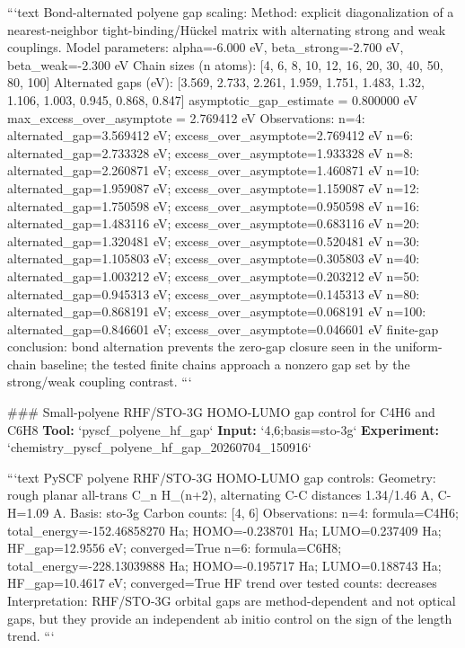 \documentclass[11pt,a4paper]{article}
\begin{document}
```text
Bond-alternated polyene gap scaling:
  Method: explicit diagonalization of a nearest-neighbor tight-binding/Hückel matrix with alternating strong and weak couplings.
  Model parameters: alpha=-6.000 eV, beta\_strong=-2.700 eV, beta\_weak=-2.300 eV
  Chain sizes (n atoms): [4, 6, 8, 10, 12, 16, 20, 30, 40, 50, 80, 100]
  Alternated gaps (eV): [3.569, 2.733, 2.261, 1.959, 1.751, 1.483, 1.32, 1.106, 1.003, 0.945, 0.868, 0.847]
  asymptotic\_gap\_estimate = 0.800000 eV
  max\_excess\_over\_asymptote = 2.769412 eV
  Observations:
    n=4: alternated\_gap=3.569412 eV; excess\_over\_asymptote=2.769412 eV
    n=6: alternated\_gap=2.733328 eV; excess\_over\_asymptote=1.933328 eV
    n=8: alternated\_gap=2.260871 eV; excess\_over\_asymptote=1.460871 eV
    n=10: alternated\_gap=1.959087 eV; excess\_over\_asymptote=1.159087 eV
    n=12: alternated\_gap=1.750598 eV; excess\_over\_asymptote=0.950598 eV
    n=16: alternated\_gap=1.483116 eV; excess\_over\_asymptote=0.683116 eV
    n=20: alternated\_gap=1.320481 eV; excess\_over\_asymptote=0.520481 eV
    n=30: alternated\_gap=1.105803 eV; excess\_over\_asymptote=0.305803 eV
    n=40: alternated\_gap=1.003212 eV; excess\_over\_asymptote=0.203212 eV
    n=50: alternated\_gap=0.945313 eV; excess\_over\_asymptote=0.145313 eV
    n=80: alternated\_gap=0.868191 eV; excess\_over\_asymptote=0.068191 eV
    n=100: alternated\_gap=0.846601 eV; excess\_over\_asymptote=0.046601 eV
  finite-gap conclusion: bond alternation prevents the zero-gap closure seen in the uniform-chain baseline; the tested finite chains approach a nonzero gap set by the strong/weak coupling contrast.
```

\#\#\# Small-polyene RHF/STO-3G HOMO-LUMO gap control for C4H6 and C6H8
\textbf{Tool:} `pyscf\_polyene\_hf\_gap`
\textbf{Input:} `4,6;basis=sto-3g`
\textbf{Experiment:} `chemistry\_pyscf\_polyene\_hf\_gap\_20260704\_150916`

```text
PySCF polyene RHF/STO-3G HOMO-LUMO gap controls:
  Geometry: rough planar all-trans C\_n H\_(n+2), alternating C-C distances 1.34/1.46 A, C-H=1.09 A.
  Basis: sto-3g
  Carbon counts: [4, 6]
  Observations:
    n=4: formula=C4H6; total\_energy=-152.46858270 Ha; HOMO=-0.238701 Ha; LUMO=0.237409 Ha; HF\_gap=12.9556 eV; converged=True
    n=6: formula=C6H8; total\_energy=-228.13039888 Ha; HOMO=-0.195717 Ha; LUMO=0.188743 Ha; HF\_gap=10.4617 eV; converged=True
  HF trend over tested counts: decreases
  Interpretation: RHF/STO-3G orbital gaps are method-dependent and not optical gaps, but they provide an independent ab initio control on the sign of the length trend.
```
\end{document}
